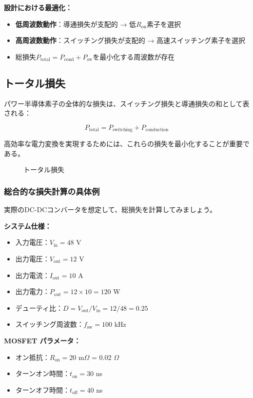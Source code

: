 \begin{screen}
\textbf{設計における最適化：}

\begin{itemize}
\item \textbf{低周波数動作}：導通損失が支配的 → 低$R_{\text{on}}$素子を選択
\item \textbf{高周波数動作}：スイッチング損失が支配的 → 高速スイッチング素子を選択
\item 総損失$P_{\text{total}} = P_{\text{cond}} + P_{\text{sw}}$を最小化する周波数が存在
\end{itemize}
\end{screen}

\subsection{トータル損失}

パワー半導体素子の全体的な損失は、スイッチング損失と導通損失の和として表される：

\begin{equation}
P_{\text{total}} = P_{\text{switching}} + P_{\text{conduction}}
\end{equation}

高効率な電力変換を実現するためには、これらの損失を最小化することが重要である。

\begin{figure}[H]
\centering
{}
\caption{トータル損失}
\label{fig:total_loss}
\end{figure}

\subsubsection{総合的な損失計算の具体例}

実際のDC-DCコンバータを想定して、総損失を計算してみましょう。

\begin{screen}
\textbf{システム仕様：}

\begin{itemize}
\item 入力電圧：$V_{\text{in}} = 48$ V
\item 出力電圧：$V_{\text{out}} = 12$ V
\item 出力電流：$I_{\text{out}} = 10$ A
\item 出力電力：$P_{\text{out}} = 12 \times 10 = 120$ W
\item デューティ比：$D = V_{\text{out}}/V_{\text{in}} = 12/48 = 0.25$
\item スイッチング周波数：$f_{\text{sw}} = 100$ kHz
\end{itemize}

\textbf{MOSFET パラメータ：}

\begin{itemize}
\item オン抵抗：$R_{\text{on}} = 20$ m$\Omega$ = 0.02 $\Omega$
\item ターンオン時間：$t_{\text{on}} = 30$ ns
\item ターンオフ時間：$t_{\text{off}} = 40$ ns
\end{itemize}
\end{screen}


